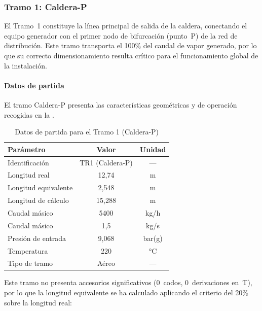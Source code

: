 \subsubsection{Tramo 1: Caldera-P}
\label{subsubsec:tramo1-caldera-p}

El Tramo~1 constituye la línea principal de salida de la caldera, conectando el equipo generador con el primer nodo de bifurcación (punto~P) de la red de distribución. Este tramo transporta el 100\% del caudal de vapor generado, por lo que su correcto dimensionamiento resulta crítico para el funcionamiento global de la instalación.

\paragraph{Datos de partida}

El tramo Caldera-P presenta las características geométricas y de operación recogidas en la .

\begin{table}[H]
	\centering
	\caption{Datos de partida para el Tramo 1 (Caldera-P)}
	\label{tab:datos-partida-tramo1}
	\begin{tabular}{lcc}
		\toprule
		\textbf{Parámetro}   & \textbf{Valor}  & \textbf{Unidad} \\
		\midrule
		Identificación       & TR1 (Caldera-P) & ---             \\
		Longitud real        & 12,74           & m               \\
		Longitud equivalente & 2,548           & m               \\
		Longitud de cálculo  & 15,288          & m               \\
		Caudal másico        & 5400            & kg/h            \\
		Caudal másico        & 1,5             & kg/s            \\
		Presión de entrada   & 9,068           & bar(g)          \\
		Temperatura          & 220             & °C              \\
		Tipo de tramo        & Aéreo           & ---             \\
		\bottomrule
	\end{tabular}
\end{table}

Este tramo no presenta accesorios significativos (0~codos, 0~derivaciones en~T), por lo que la longitud equivalente se ha calculado aplicando el criterio del 20\% sobre la longitud real:

